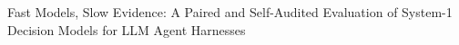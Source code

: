 Fast Models, Slow Evidence: A Paired and Self-Audited Evaluation of System-1 Decision Models for LLM Agent Harnesses
